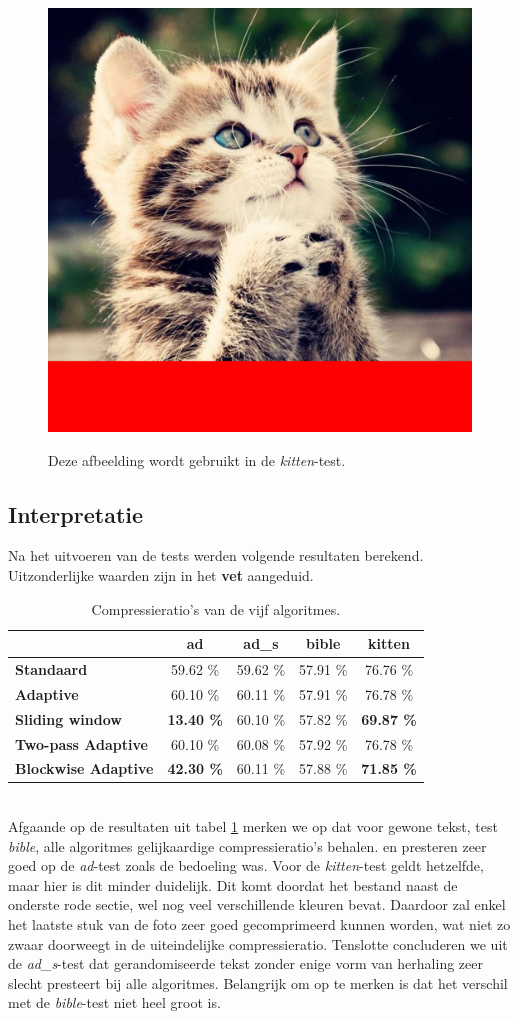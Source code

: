 \begin{figure}[h]
	\centering
	\includegraphics[width=0.3\linewidth]{resources/ratio-kitten.png}
	\label{fig:cutekitten}
	\caption{Deze afbeelding wordt gebruikt in de
	\emph{kitten}-test. \cite{cutekitten}}
\end{figure}
\newpage
\subsection{Interpretatie}
Na het uitvoeren van de tests werden volgende resultaten berekend. Uitzonderlijke waarden zijn in het \textbf{vet} aangeduid.
\begin{table}[h]
	\centering
	\begin{tabular}{|l||c|c|c|c|}
		\hline
		& \textbf{ad} & \textbf{ad\_s} & \textbf{bible} & \textbf{kitten}\\\hline
		\textbf{Standaard} & 59.62 \% & 59.62 \% & 57.91 \% & 76.76 \%\\
		\textbf{Adaptive} & 60.10 \% & 60.11 \% & 57.91 \% & 76.78 \%\\		
		\textbf{Sliding window} & \textbf{13.40 \%} & 60.10 \% & 57.82 \% & \textbf{69.87 \%}\\
		\textbf{Two-pass Adaptive} & 60.10 \% & 60.08 \% & 57.92 \% & 76.78 \%\\
		\textbf{Blockwise Adaptive} & \textbf{42.30 \%} & 60.11 \% & 57.88 \% & \textbf{71.85 \%}\\
		\hline
	\end{tabular}
	\label{tbl:compressieratios}
	\caption{Compressieratio's van de vijf algoritmes.}
\end{table}
\\Afgaande op de resultaten uit tabel \ref{tbl:compressieratios} merken we op dat voor gewone tekst, test \emph{bible}, alle algoritmes gelijkaardige compressieratio's behalen. \huffslid en \huffblock presteren zeer goed op de \emph{ad}-test zoals de bedoeling was. Voor de \emph{kitten}-test geldt hetzelfde, maar hier is dit minder duidelijk. Dit komt doordat het bestand naast de onderste rode sectie, wel nog veel verschillende kleuren bevat. Daardoor zal enkel het laatste stuk van de foto zeer goed gecomprimeerd kunnen worden, wat niet zo zwaar doorweegt in de uiteindelijke compressieratio. Tenslotte concluderen we uit de \emph{ad\_s}-test dat gerandomiseerde tekst zonder enige vorm van herhaling zeer slecht presteert bij alle algoritmes. Belangrijk om op te merken is dat het verschil met de \emph{bible}-test niet heel groot is.

